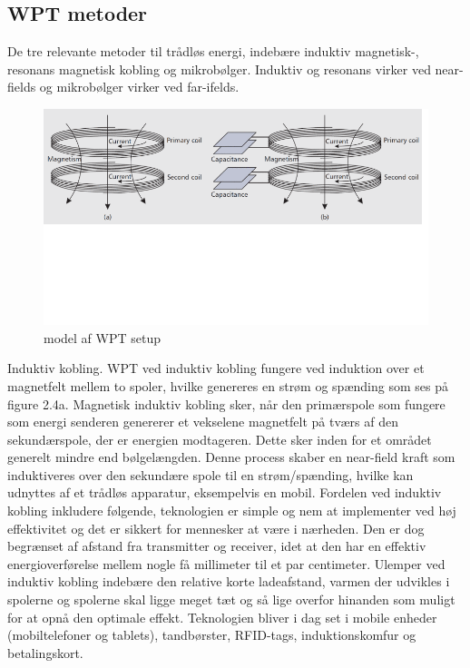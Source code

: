 \subsection{WPT metoder}
De tre relevante metoder til trådløs energi, indebære induktiv magnetisk-, resonans magnetisk kobling og mikrobølger. Induktiv og resonans virker ved near-fields og mikrobølger virker ved far-ifelds.

\begin{figure}[H]
\centering
\includegraphics[scale=0.5]{Vildledning/Schematics/induktiv_resonans}
\caption{model af WPT setup}
\label{model af WPT setup}
\end{figure}

Induktiv kobling. 
WPT ved induktiv kobling fungere ved induktion over et magnetfelt mellem to spoler, hvilke genereres en strøm og spænding som ses på figure 2.4a. Magnetisk induktiv kobling sker, når den primærspole som fungere som energi senderen genererer et vekselene magnetfelt på tværs af den sekundærspole, der er energien modtageren. Dette sker inden for et området generelt mindre end bølgelængden. Denne process skaber en near-field kraft som induktiveres over den sekundære spole til en strøm/spænding, hvilke kan udnyttes af et trådløs apparatur, eksempelvis en mobil. 
Fordelen ved induktiv kobling inkludere følgende, teknologien er simple og nem at implementer ved høj effektivitet og det er sikkert for mennesker at være i nærheden. Den er dog begrænset af afstand fra transmitter og receiver, idet at den har en effektiv energioverførelse mellem nogle få millimeter til et par centimeter. Ulemper ved induktiv kobling indebære den relative korte ladeafstand, varmen der udvikles i spolerne og spolerne skal ligge meget tæt og så lige overfor hinanden som muligt for at opnå den optimale effekt.
Teknologien bliver i dag set i mobile enheder (mobiltelefoner og tablets), tandbørster, RFID-tags, induktionskomfur og betalingskort.

